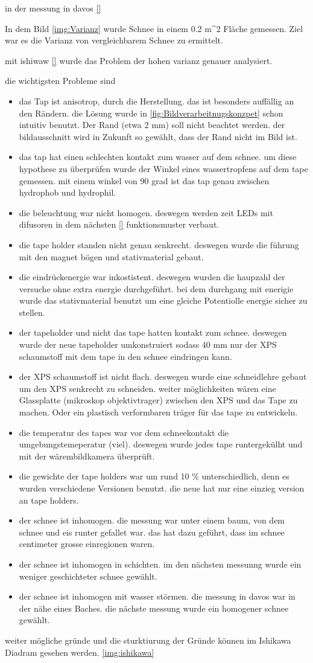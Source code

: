 in der messung in davos \ref{}

In dem Bild \ref{img:Varianz} wurde Schnee in einem 0.2 m^2 Fläche gemessen. Ziel war es die Varianz von vergleichbarem Schnee zu ermittelt.

mit ishiwaw \ref{} wurde das Problem der hohen varianz genauer analysiert.

die wichtigsten Probleme sind
\begin{itemize}
\item das Tap ist anisotrop, durch die Herstellung. das ist besonders auffällig an den Rändern. die Lösung wurde in \ref{fig:Bildverarbeitnugskonzpet} schon intuitiv benutzt. Der Rand (etwa 2 mm) soll nicht beachtet werden. der bildausschnitt wird in Zukunft so gewählt, dass der Rand nicht im Bild ist.
\item das tap hat einen schlechten kontakt zum wasser auf dem schnee. um diese hypothese zu überprüfen wurde der Winkel eines wassertropfens auf dem tape gemessen. mit einem winkel von 90 grad ist das tap genau zwischen hydrophob und hydrophil.
\item die beleuchtung war nicht homogen. deswegen werden zeit LEDs mit difusoren in dem nächsten \ref{} funktionsmuster verbaut.
\item die tape holder standen nicht genau senkrecht. deswegen wurde die führung mit den magnet bögen und stativmaterial gebaut.
\item die eindrückenergie war inkostistent. deswegen wurden die haupzahl der versuche ohne extra energie durchgeführt. bei dem durchgang mit enerigie wurde das stativmaterial benutzt um eine gleiche Potentiolle energie sicher zu stellen.
\item der tapeholder und nicht das tape hatten kontakt zum schnee. deswegen wurde der neue tapeholder umkonstruiert sodass 40 mm nur der XPS schaumstoff mit dem tape in den schnee eindringen kann.
\item der XPS schaumstoff ist nicht flach. deswegen wurde eine schneidlehre gebaut um den XPS senkrecht  zu schneiden. weiter möglichkeiten wären eine Glassplatte (mikroskop objektivtrager) zwischen den XPS und das Tape zu machen. Oder ein plastisch verformbaren träger für das tape zu entwickeln.
\item die temperatur des tapes war vor dem schneekontakt die umgebungstemeperatur (viel). deswegen wurde jedes tape runtergekülht und mit der wärembildkamera überprüft.
\item die gewichte der tape holders war um rund 10 \% unterschiedlich, denn es wurden verschiedene Versionen benutzt. die neue hat nur eine einzieg version an tape holders.
\item der schnee ist inhomogen. die messung war unter einem baum, von dem schnee und eis runter gefallet war. das hat dazu geführt, dass im schnee centimeter grosse einregionen waren.
\item der schnee ist inhomogen in schichten. im den nächsten messunng wurde ein weniger geschichteter schnee gewählt.
\item der schnee ist inhomogen mit wasser störmen. die messung in davos war in der nähe eines Baches. die nächste messung wurde ein homogener schnee gewählt.
\end{itemize}

weiter mögliche gründe und die sturktiurung der Gründe können im Ishikawa Diadram gesehen werden. \ref{img:ishikawa}
